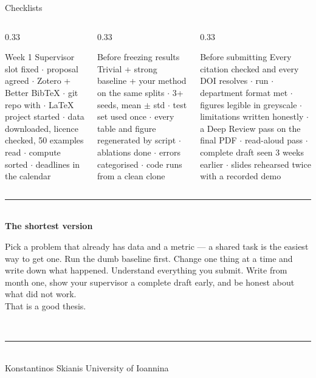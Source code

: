 \documentclass[aspectratio=169,11pt]{beamer}
\begin{document}
\begin{frame}{Checklists}
\begin{columns}[T]
\begin{column}{0.33\textwidth}
\begin{block}{Week 1}
\scriptsize
Supervisor slot fixed $\cdot$ proposal agreed $\cdot$ Zotero + Better BibTeX
$\cdot$ git repo with  $\cdot$ LaTeX project started $\cdot$ data
downloaded, licence checked, 50 examples read $\cdot$ compute sorted $\cdot$
deadlines in the calendar
\end{block}
\end{column}
\begin{column}{0.33\textwidth}
\begin{block}{Before freezing results}
\scriptsize
Trivial + strong baseline + your method on the same splits $\cdot$ 3+ seeds,
mean $\pm$ std $\cdot$ test set used once $\cdot$ every table and figure
regenerated by script $\cdot$ ablations done $\cdot$ errors categorised $\cdot$
code runs from a clean clone
\end{block}
\end{column}
\begin{column}{0.33\textwidth}
\begin{block}{Before submitting}
\scriptsize
Every citation checked and every DOI resolves $\cdot$  run
$\cdot$ department format met
$\cdot$ figures legible in greyscale $\cdot$ limitations written honestly $\cdot$ a Deep Review pass on the final PDF
$\cdot$ read-aloud pass $\cdot$ complete draft seen 3 weeks earlier $\cdot$
slides rehearsed twice with a recorded demo
\end{block}
\end{column}
\end{columns}
\end{frame}

\begin{frame}
\vfill
\centering
{\color{brandlight}\rule{0.8\textwidth}{1.4pt}}\\[10pt]
{\large\bfseries\color{brand}The shortest version}\\[10pt]
\begin{minipage}{0.82\textwidth}\centering
Pick a problem that already has data and a metric --- a shared task is the
easiest way to get one. Run the dumb baseline first. Change one thing at a time
and write down what happened. Understand everything you submit. Write from
month one, show your supervisor a complete draft early, and be honest about
what did not work.\\[6pt]
That is a good thesis.
\end{minipage}\\[12pt]
{\color{brandlight}\rule{0.8\textwidth}{1.4pt}}\\[14pt]
{\footnotesize\color{mutegray}Konstantinos Skianis \quad\textbullet\quad
University of Ioannina \quad\textbullet\quad
{}}
\vfill
\end{frame}
\end{document}
